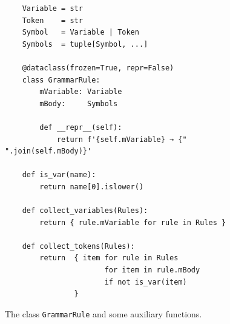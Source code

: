\begin{figure}[!ht]
\centering
\begin{verbatim}
    Variable = str
    Token    = str
    Symbol   = Variable | Token
    Symbols  = tuple[Symbol, ...]

    @dataclass(frozen=True, repr=False)
    class GrammarRule:
        mVariable: Variable
        mBody:     Symbols

        def __repr__(self):
            return f'{self.mVariable} → {" ".join(self.mBody)}'

    def is_var(name):
        return name[0].islower()

    def collect_variables(Rules):
        return { rule.mVariable for rule in Rules }

    def collect_tokens(Rules):
        return  { item for rule in Rules
                       for item in rule.mBody
                       if not is_var(item)
                }
\end{verbatim}
\vspace*{-0.3cm}
\caption{The class \texttt{GrammarRule} and some auxiliary functions.}
\label{fig:04-SLR-Table-Generator.ipynb:GrammarRule}
\end{figure}

